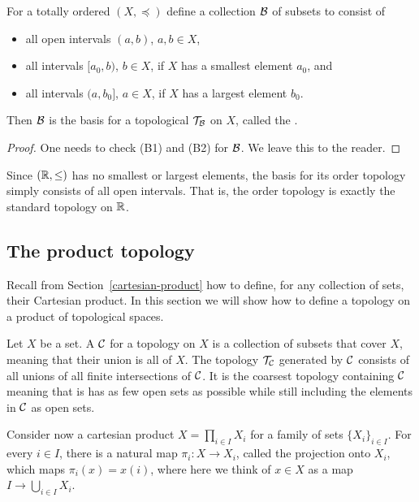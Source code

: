\begin{prop}
  For a totally ordered $(X,\preceq)$ define a collection $\mathcal{B}$ of subsets to consist of
  \begin{itemize}
    \item all open intervals $(a,b)$, $a,b \in X$,
    \item all intervals $[a_0,b)$, $b \in X$, if $X$ has a smallest element $a_0$, and
    \item all intervals $(a,b_0]$, $a \in X$, if $X$ has a largest element $b_0$.
  \end{itemize}
  Then $\mathcal{B}$ is the basis for a topological $\mathcal{T}_{\mathcal{B}}$ on $X$, called the .
\end{prop}
\begin{proof}
  One needs to check (B1) and (B2) for $\mathcal{B}$. We leave this to the reader.
\end{proof}
\begin{example}
  Since $(\mathbb{R},\leq)$ has no smallest or largest elements, the basis for its order topology simply consists of all open intervals. That is, the order topology is exactly the standard topology on $\mathbb{R}$.
\end{example}

\subsection{The product topology}
Recall from Section~\ref{cartesian-product} how to define, for any collection of sets, their Cartesian product. In this section we will show how to define a topology on a product of topological spaces.

\begin{defn}
  Let $X$ be a set. A  $\mathcal{C}$ for a topology on $X$ is a collection of subsets that cover $X$, meaning that their union is all of $X$. The topology $\mathcal{T}_{\mathcal{C}}$ generated by $\mathcal{C}$ consists of all unions of all finite intersections of $\mathcal{C}$. It is the coarsest topology containing $\mathcal{C}$ meaning that is has as few open sets as possible while still including the elements in $\mathcal{C}$ as open sets.
\end{defn}
Consider now a cartesian product $X = \prod_{i \in I} X_i$ for a family of sets $\{ X_i \}_{i \in I}$. For every $i \in I$, there is a natural map $\pi_i : X \to X_i$, called the projection onto $X_i$, which maps $\pi_i(x) = x(i)$, where here we think of $x \in X$ as a map $I \to \bigcup_{i \in I} X_i$.

